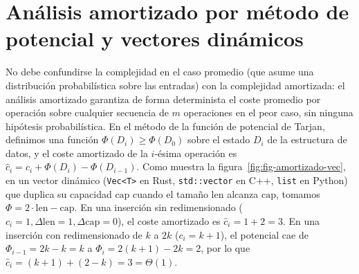 \documentclass{book}
\begin{document}
\section{Análisis amortizado por método de potencial y vectores dinámicos}

No debe confundirse la complejidad en el caso promedio (que asume una distribución probabilística sobre las entradas) con la complejidad amortizada: el análisis amortizado garantiza de forma determinista el coste promedio por operación sobre cualquier secuencia de \(m\) operaciones en el peor caso, sin ninguna hipótesis probabilística. En el método de la función de potencial de Tarjan, definimos una función \(\Phi(D_i) \ge \Phi(D_0)\) sobre el estado \(D_i\) de la estructura de datos, y el coste amortizado de la \(i\)-ésima operación es \(\hat{c}_i = c_i + \Phi(D_i) - \Phi(D_{i-1})\).
Como muestra la figura~\ref{fig:fig-amortizado-vec}, en un vector dinámico (\texttt{Vec<T>} en Rust, \texttt{std::vector} en C++, \texttt{list} en Python) que duplica su capacidad \(\text{cap}\) cuando el tamaño \(\text{len}\) alcanza \(\text{cap}\), tomamos \(\Phi = 2 \cdot \text{len} - \text{cap}\). En una inserción sin redimensionado (\(c_i = 1, \Delta\text{len} = 1, \Delta\text{cap} = 0\)), el coste amortizado es \(\hat{c}_i = 1 + 2 = 3\). En una inserción con redimensionado de \(k\) a \(2k\) (\(c_i = k + 1\)), el potencial cae de \(\Phi_{i-1} = 2k - k = k\) a \(\Phi_i = 2(k+1) - 2k = 2\), por lo que \(\hat{c}_i = (k + 1) + (2 - k) = 3 = \Theta(1)\).
\end{document}
